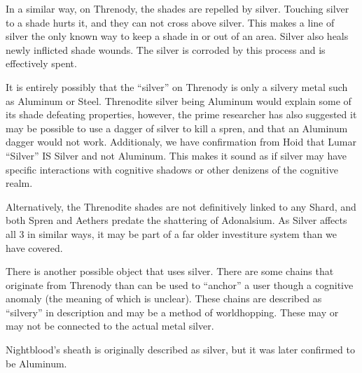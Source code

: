 \documentclass[conference]{IEEEtran}
\newcommand{\n}{\hfill\break}
\begin{document}
 In a similar way, on Threnody, the shades are repelled by silver.\cite{SFSFH-CH3}  Touching silver to a shade hurts it,\cite{SFSFH-CH1} and they can not cross above silver.\cite{SFSFH-CH3}  This makes a line of silver the only known way to keep a shade in or out of an area.\cite{SFSFH-CH1}  Silver also heals newly inflicted shade wounds.\cite{SFSFH-CH2}  The silver is corroded by this process and is effectively spent.\cite{SFSFH-CH1}  
 
It is entirely possibly that the ``silver'' on Threnody is only a silvery metal such as Aluminum or Steel.  Threnodite silver being Aluminum would explain some of its shade defeating properties, however, the prime researcher has also suggested it may be possible to use a dagger of silver to kill a spren, and that an Aluminum dagger would not work.\cite{silver-spren}  Additionaly, we have confirmation from Hoid that Lumar ``Silver'' IS Silver\cite{ToES-CH4} and not Aluminum.
\cite{ToES-CH23} This makes it sound as if silver may have specific interactions with cognitive shadows or other denizens of the cognitive realm.  

Alternatively, the Threnodite shades are not definitively linked to any Shard, and both Spren\cite{ado-spren} and Aethers\cite{TLM-CH42} predate the shattering of Adonalsium.  As Silver affects all 3 in similar ways, it may be part of a far older investiture system than we have covered.

There is another possible object that uses silver.  There are some chains that originate from Threnody than can be used to ``anchor'' a user though a cognitive anomaly (the meaning of which is unclear).\cite{anchor}\cite{RoW-CH64}  These chains are described as ``silvery'' in description and may be a method of worldhopping.  These may or may not be connected to the actual metal silver.

Nightblood's sheath is originally described as silver, but it was later confirmed to be Aluminum.\cite{WB-pre}\cite{al-night}


\n
\end{document}

